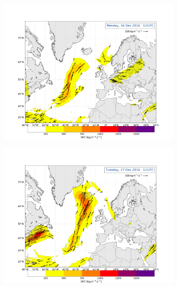 \begin{figure}
\begin{subfigure}[b]{0.49\textwidth}
		\includegraphics[trim={4.2cm 3.9cm 4.3cm 5.1cm},clip,
		width=\textwidth]{./fig_Atm_Riv/20161226_12}
		\caption{}\label{fig:AR26}
	\end{subfigure}
	\begin{subfigure}[b]{0.49\textwidth}
		\includegraphics[trim={4.2cm 3.9cm 4.3cm 5.1cm},clip,
		width=\textwidth]{./fig_Atm_Riv/20161227_12}
		\caption{}\label{fig:AR27}
	\end{subfigure}
	\begin{subfigure}[b]{\textwidth}

\end{subfigure}
\end{figure}
